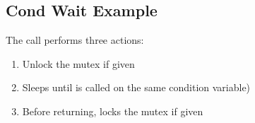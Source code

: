 \subsection{Cond Wait Example}

The call  performs three actions: 

\begin{enumerate}
\item Unlock the mutex if given
\item Sleeps until  is called on the same condition variable) 
\item Before returning, locks the mutex if given
\end{enumerate}


